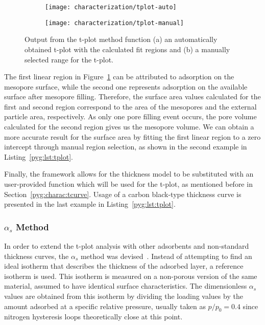 \begin{figure}[!htb]
	\centering

	\begin{subfigure}{0.45\linewidth}
		\parbox[c]{0.1\linewidth}{\caption{}%
			\label{pyg:fgr:tplot-auto}}
		\parbox[b]{0.85\linewidth}{%
			\texttt{[image: characterization/tplot-auto]}}
	\end{subfigure}
	\begin{subfigure}{0.45\linewidth}
		\parbox[c]{0.1\linewidth}{\caption{}%
			\label{pyg:fgr:tplot-manual}}
		\parbox[b]{0.85\linewidth}{%
			\texttt{[image: characterization/tplot-manual]}}
	\end{subfigure}

	\caption{Output from the t-plot method function (a) an automatically
		obtained t-plot with the calculated fit regions and (b) a manually
		selected range for the t-plot.}%
	\label{pyg:fgr:tplot}

\end{figure}

The first linear region in Figure~\ref{pyg:fgr:tplot-auto} can be attributed
to adsorption on the mesopore surface,
while the second one represents adsorption on the available surface
after mesopore filling. Therefore, the surface area values calculated 
for the first and second region correspond to the area of the mesopores
and the external particle area, respectively. As only one pore filling 
event occurs, the pore volume calculated for the second region gives
us the mesopore volume. We can obtain a more accurate result for the
surface area by fitting the first linear region to a zero intercept
through manual region selection, as shown in the second example in 
Listing~\ref{pyg:lst:tplot}.

Finally, the framework allows for the thickness model to be substituted
with an user-provided function which will be used for the t-plot, 
as mentioned before in Section~\ref{pyg:charac:tcurve}.
Usage of a carbon black-type thickness curve is presented in the last
example in Listing~\ref{pyg:lst:tplot}.

\subsubsection{\(\alpha_s\) Method}\label{pyg:charac:alphasplot}

In order to extend the t-plot analysis with other adsorbents and 
non-standard thickness curves, the \(\alpha_s\) method was
devised~\cite{atkinsonAdsorptivePropertiesMicroporous1984}.
Instead of attempting to find an ideal isotherm that describes the
thickness of the adsorbed layer, a reference isotherm is used.
This isotherm is measured on a non-porous version of the same material,
assumed to have identical surface characteristics.
The dimensionless \(\alpha_s\) values are obtained from this isotherm by
dividing the loading values by the amount adsorbed at a specific relative
pressure, usually taken as \(p/p_0=0.4\) since nitrogen hysteresis loops
theoretically close at this point.

